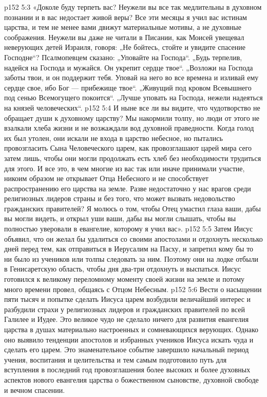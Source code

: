 \vs p152 5:3 \pc «Доколе буду терпеть вас? Неужели вы все так медлительны в духовном познании и в вас недостает живой веры? Все эти месяцы я учил вас истинам царства, и тем не менее вами движут материальные мотивы, а не духовные соображения. Неужели вы даже не читали в Писании, как Моисей увещевал неверующих детей Израиля, говоря: „Не бойтесь, стойте и увидите спасение Господне“? Псалмопевцем сказано: „Уповайте на Господа“. „Будь терпелив, надейся на Господа и мужайся. Он укрепит сердце твое“. „Возложи на Господа заботы твои, и он поддержит тебя. Уповай на него во все времена и изливай ему сердце свое, ибо Бог --- прибежище твое“. „Живущий под кровом Всевышнего под сенью Всемогущего покоится“. „Лучше уповать на Господа, нежели надеяться на князей человеческих“.
\vs p152 5:4 И ныне все ли вы видите, что чудотворство не обращает души к духовному царству? Мы накормили толпу, но люди от этого не взалкали хлеба жизни и не возжаждали вод духовной праведности. Когда голод их был утолен, они искали не входа в царство небесное, но пытались провозгласить Сына Человеческого царем, как провозглашают царей мира сего затем лишь, чтобы они могли продолжать есть хлеб без необходимости трудиться для этого. И все это, в чем многие из вас так или иначе принимали участие, никоим образом не открывает Отца Небесного и не способствует распространению его царства на земле. Разве недостаточно у нас врагов среди религиозных лидеров страны и без того, что может вызвать недовольство гражданских правителей? Я молюсь о том, чтобы Отец умастил глаза ваши, дабы вы могли видеть, и открыл уши ваши, дабы вы могли слышать, чтобы вы полностью уверовали в евангелие, которому я учил вас».
\vs p152 5:5 \pc Затем Иисус объявил, что он желал бы удалиться со своими апостолами и отдохнуть несколько дней перед тем, как отправиться в Иерусалим на Пасху, и запретил кому бы то ни было из учеников или толпы следовать за ним. Поэтому они на лодке отбыли в Генисаретскую область, чтобы дня два\hyp{}три отдохнуть и выспаться. Иисус готовился к великому переломному моменту своей жизни на земле и потому много времени провел, общаясь с Отцом Небесным.
\vs p152 5:6 Вести о насыщении пяти тысяч и попытке сделать Иисуса царем возбудили величайший интерес и разбудили страхи у религиозных лидеров и гражданских правителей по всей Галилее и Иудее. Это великое чудо не сделало ничего для развития евангелия царства в душах материально настроенных и сомневающихся верующих. Однако оно выявило тенденции апостолов и избранных учеников Иисуса искать чуда и сделать его царем. Это знаменательное событие завершило начальный период учения, воспитания и целительства и тем самым подготовило путь для вступления в последний год провозглашения более высоких и более духовных аспектов нового евангелия царства о божественном сыновстве, духовной свободе и вечном спасении.
